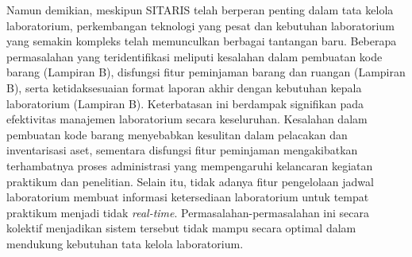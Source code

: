 Namun demikian, meskipun SITARIS telah berperan penting dalam tata kelola laboratorium, perkembangan teknologi yang pesat dan kebutuhan laboratorium yang semakin kompleks telah memunculkan berbagai tantangan baru. Beberapa permasalahan yang teridentifikasi meliputi kesalahan dalam pembuatan kode barang (Lampiran B), disfungsi fitur peminjaman barang dan ruangan (Lampiran B), serta ketidaksesuaian format laporan akhir dengan kebutuhan kepala laboratorium (Lampiran B). Keterbatasan ini berdampak signifikan pada efektivitas manajemen laboratorium secara keseluruhan. Kesalahan dalam pembuatan kode barang menyebabkan kesulitan dalam pelacakan dan inventarisasi aset, sementara disfungsi fitur peminjaman mengakibatkan terhambatnya proses administrasi yang mempengaruhi kelancaran kegiatan praktikum dan penelitian. Selain itu, tidak adanya fitur pengelolaan jadwal laboratorium membuat informasi ketersediaan laboratorium untuk tempat praktikum menjadi tidak \textit{real-time}. Permasalahan-permasalahan ini secara kolektif menjadikan sistem tersebut tidak mampu secara optimal dalam mendukung kebutuhan tata kelola laboratorium.


